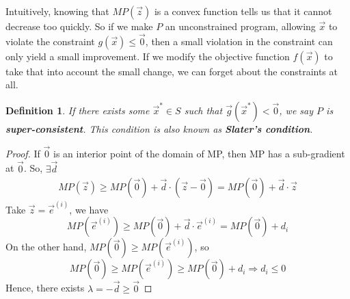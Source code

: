 \documentclass[11pt,a4paper]{article}
\newtheorem{lemma}{Lemma}
\newtheorem{definition}{Definition}
\begin{document}
\subsubsection{}
Intuitively, knowing that $MP(\vec{z})$ is a convex function tells us that it cannot decrease too quickly. So if we make $P$ an unconstrained program, allowing $\vec{x}$ to violate the constraint $g(\vec{x}) \leq \vec{0}$, then a small violation in the constraint can only yield a small improvement. If we modify the objective function $f(\vec{x})$ to take that into account the small change, we can forget about the constraints at all.

\begin{definition}
    If there exists some $\vec{x}^*\in S$ such that $\vec{g}(\vec{x}^*)<\vec{0}$, we say $P$ is \textbf{super-consistent}. This condition is also known as \textbf{Slater's condition}.
\end{definition}
\begin{center}
\end{center}
\begin{proof}
    If $\vec{0}$ is an interior point of the domain of MP, then MP has a sub-gradient at $\vec{0}$. So, $\exists \vec{d}$
    \begin{equation}
        \begin{aligned}
            MP(\vec{z})\geq MP(\vec{0})+\vec{d}\cdot(\vec{z}-\vec{0})=MP(\vec{0})+\vec{d}\cdot\vec{z}
        \end{aligned}
        \nonumber
    \end{equation}
    Take $\vec{z}=\vec{e}^{(i)}$, we have $$MP(\vec{e}^{(i)})\geq MP(\vec{0})+\vec{d}\cdot \vec{e}^{(i)}=MP(\vec{0})+d_i$$
    On the other hand, $MP(\vec{0})\geq MP(\vec{e}^{(i)})$, so $$MP(\vec{0})\geq MP(\vec{e}^{(i)})\geq MP(\vec{0})+d_i \Rightarrow d_i\leq 0$$
    Hence, there exists $\lambda=-\vec{d}\geq \vec{0}$
\end{proof}
\end{document}
